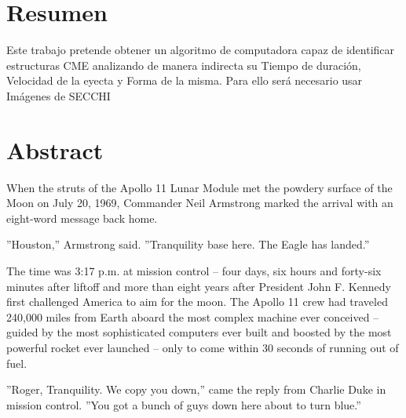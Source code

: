 

\chapter*{Resumen}


Este trabajo pretende obtener un algoritmo de computadora capaz de identificar estructuras CME analizando de manera indirecta su Tiempo de duración, Velocidad de la eyecta y Forma de la misma. Para ello será necesario usar Imágenes de SECCHI



\cleardoublepage


\chapter*{Abstract}


When the struts of the Apollo 11 Lunar Module met the powdery surface of the Moon on July 20, 1969, Commander Neil Armstrong marked the arrival with an eight-word message back home. 

''Houston,'' Armstrong said. ''Tranquility base here. The Eagle has landed.'' 

The time was 3:17 p.m. at mission control – four days, six hours and forty-six minutes after liftoff and more than eight years after President John F. Kennedy first challenged America to aim for the moon. The Apollo 11 crew had traveled 240,000 miles from Earth aboard the most complex machine ever conceived – guided by the most sophisticated computers ever built and boosted by the most powerful rocket ever launched – only to come within 30 seconds of running out of fuel. 

''Roger, Tranquility. We copy you down,'' came the reply from Charlie Duke in mission control. ''You got a bunch of guys down here about to turn blue.''



\cleardoublepage

